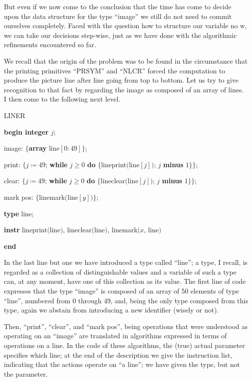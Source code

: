 \documentclass[twoside,11pt]{book}
\begin{document}
But even if we now come to the conclusion that the time has come to decide upon the data structure for the type ``image'' we still do not need to commit ourselves completely. Faced with the question how to structure our variable no w, we can take our decisions step-wise, just as we have done with the algorithmic refinements encountered so far.

We recall that the origin of the problem was to be found in the circumstance that the printing primitives ``PRSYM'' and ``NLCR'' forced the computation to produce the picture line after line going from top to bottom. Let us try to give recognition to that fact by regarding the image as composed of an array of lines. I then come to the following next level.

LINER

\textbf{begin integer} $j$;

\quad image: $\{$\textbf{array} line$[0: 49]\}$;

\quad print: $\{j \coloneq 49$; \textbf{while} $j \geqslant 0$ \textbf{do} $\{$lineprint$($line$[j])$; $j$ \textbf{minus} $1\}\}$;

\quad clear: $\{j \coloneq 49$; \textbf{while} $j \geqslant 0$ \textbf{do} $\{$lineclear$($line$[j])$; $j$ \textbf{minus} $1\}\}$;

\quad mark pos: $\{$linemark$($line$[y])\}$;

\quad \textbf{type} line;

\quad \textbf{instr} lineprint$($line$)$, lineclear$($line$)$, linemark$(x$, line$)$

\textbf{end}

In the last line but one we have introduced a type called ``line''; a type, I recall, is regarded as a collection of distinguishable values and a variable of such a type can, at any moment, have one of this collection as its value. The first line of code expresses that the type ``image'' is composed of an array of 50 elements of type ``line'', numbered from 0 through 49, and, being the only type composed from this type, again we abstain from introducing a new identifier (wisely or not).

Then, ``print'', ``clear'', and ``mark pos'', being operations that were understood as operating on an ``image'' are translated in algorithms expressed in terms of operations on a line. In the code of these algorithms, the (true) actual parameter specifies which line; at the end of the description we give the instruction list, indicating that the actions operate on ``a line''; we have given the type, but not the parameter.
\end{document}
